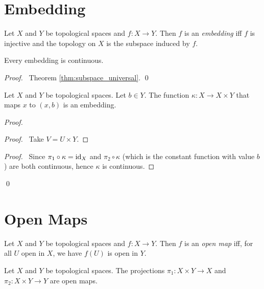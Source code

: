 \section{Embedding}

\begin{df}[Embedding]
Let $X$ and $Y$ be topological spaces and $f : X \rightarrow Y$. Then $f$ is an \emph{embedding} iff $f$ is injective and the topology on $X$ is the subspace induced by $f$.
\end{df}

\begin{prop}
Every embedding is continuous.
\end{prop}

\begin{proof}
\pf\ Theorem \ref{thm:subspace_universal}. \qed
\end{proof}

\begin{prop}
Let $X$ and $Y$ be topological spaces. Let $b \in Y$. The function $\kappa : X \rightarrow X \times Y$ that maps $x$ to $(x,b)$ is an embedding.
\end{prop}

\begin{proof}
\pf
{}
\begin{proof}
	\pf\ Take $V = U \times Y$.
\end{proof}
\begin{proof}
	\pf\ Since $\pi_1 \circ \kappa = \mathrm{id}_{X}$ and $\pi_2 \circ \kappa$ (which is the constant function with value $b$) are both continuous, hence $\kappa$ is continuous.
\end{proof}
\qed
\end{proof}

\section{Open Maps}

\begin{df}
Let $X$ and $Y$ be topological spaces and $f : X \rightarrow Y$. Then $f$ is an \emph{open map} iff, for all $U$ open in $X$, we have $f(U)$ is open in $Y$.
\end{df}

\begin{prop}
Let $X$ and $Y$ be topological spaces. The projections $\pi_1 : X \times Y \rightarrow X$ and $\pi_2 : X \times Y \rightarrow Y$ are open maps.
\end{prop}


